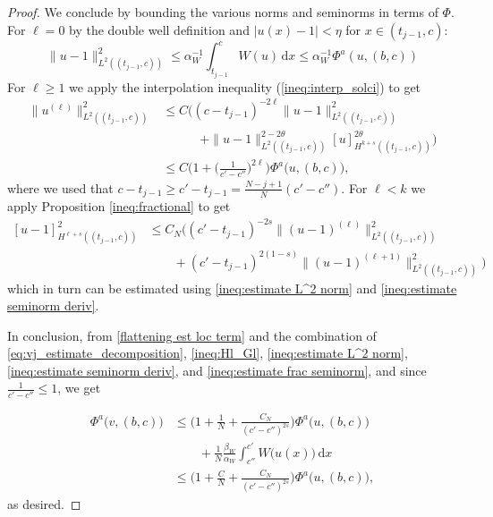 \documentclass{article}
\theoremstyle{definition}
\newcommand{\abs}[1]{\left|#1\right|}
\newcommand{\de}{\mathrm{d}}
\let\l\ell
\begin{document}
\begin{proof}
 We conclude by bounding the various norms and seminorms in terms of $\Phi$. For $\l=0$ by the double well definition and $\abs{u(x)-1} < \eta$ for $x\in (t_{j-1}, c)$:
 \begin{equation}
 \label{ineq:estimate L^2 norm}
     \|u-1\|^2_{L^2((t_{j-1},c))}\leq \alpha_W^{-1}\int_{t_{j-1}}^c W (u)\,\de x \leq \alpha_W^{-1}\Phi^a(u, (b,c))
 \end{equation}
  For $\l\ge 1$ we apply the interpolation inequality (\ref{ineq:interp_solci}) to get
 \begin{equation}
 \label{ineq:estimate seminorm deriv}
     \begin{split}
         \|{u^{(\ell)}}\|^2_{L^2((t_{j-1},c))}&\leq C\big( (c-t_{j-1})^{-2\l}\| u-1\|^2_{L^2((t_{j-1},c))}\\
         &\qquad\quad+  \| u-1\|^{2-2\theta}_{L^2((t_{j-1},c))}[u]^{2\theta}_{H^{k+s}((t_{j-1},c))} \big)\\
         &\leq  C\Big(1 + \Big(\frac{1}{c'-c''}\Big)^{2\l}\Big)  \Phi^a\big(u, (b,c)\big),
     \end{split}
 \end{equation}
where we used that $c-t_{j-1} \geq c'-t_{j-1} = \frac{N-j+1}{N}(c'-c'')$. 
For $\l<k$ we apply Proposition \ref{ineq:fractional} to get
\begin{equation}
\label{ineq:estimate frac seminorm}
    \begin{split}
        [u-1] ^2_{H^{\l+s}((t_{j-1},c))}&\leq C_{N}\Big((c'-t_{j-1})^{-2s}\|(u-1)^{(\l)}\|^2_{L^2((t_{j-1},c))}\\
        &\qquad +(c'-t_{j-1})^{2(1-s)}\|(u-1)^{(\l+1)}\|^2_{L^2((t_{j-1},c))}\Big) 
    \end{split}
\end{equation}
which in turn can be estimated using \eqref{ineq:estimate L^2 norm} and \eqref{ineq:estimate seminorm deriv}.

In conclusion,  from \eqref{flattening est loc term} and the combination of \eqref{eq:vj_estimate_decomposition}, \eqref{ineq:Hl_Gl}, \eqref{ineq:estimate L^2 norm}, \eqref{ineq:estimate seminorm deriv}, and \eqref{ineq:estimate frac seminorm}, and since  $\frac{1}{c'-c''}\leq 1$, we get
 
\begin{equation*}
\begin{split}
        \Phi^a\big(v, (b,c)\big)&\leq \bigg(1+\frac{1}{N}+\frac{C_N}{(c'-c'')^{2s}}\bigg)\Phi^a\big(u, (b,c)\big)\\
        &\qquad+\frac{1}{N}\frac{\beta_W}{\alpha_W}\int_{c''}^{c'}W\big(u(x)\big)\,\de x\\
        &\leq \bigg(1 +\frac{C}{N}+\frac{C_N}{(c'-c'')^{2s}}\bigg)\Phi^a\big(u, (b,c)\big),
\end{split}
\end{equation*}
as desired.
 
\end{proof}
\end{document}
